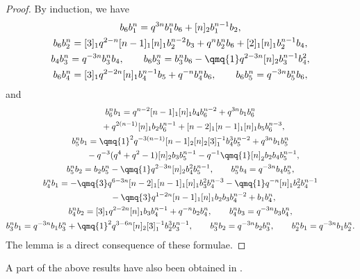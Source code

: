 \begin{proof} By induction, we have
\begin{gather*}
 b_6 b_1^n = q^{3 n} b_1^n b_6+[n]_2 b_1^{n-1} b_2,\\
 b_6 b_2^n = [3]_1 q^{2-n} [n-1]_1 [n]_1 b_2^{n-2} b_3+q^n b_2^n b_6+[2]_1 [n]_1 b_2^{n-1} b_4,\\
 b_4 b_3^n = q^{-3 n} b_3^n b_4,\qquad
 b_6 b_3^n = b_3^n b_6-\qmq{1} q^{2-3 n} [n]_2 b_3^{n-1} b_4^2,\\
 b_6 b_4^n = [3]_1 q^{2-2 n} [n]_1 b_4^{n-1} b_5+q^{-n} b_4^n b_6, \qquad
 b_6 b_5^n = q^{-3 n} b_5^n b_6,
 \end{gather*}
and
\begin{gather*}
 b_6^n b_1 = q^{n-2} [n-1]_1 [n]_1 b_4 b_6^{n-2}+q^{3 n} b_1 b_6^n \\
\hphantom{b_6^n b_1 =}{}
 +q^{2 (n-1)} [n]_1 b_2 b_6^{n-1}+[n-2]_1 [n-1]_1 [n]_1 b_5 b_6^{n-3},\\
 b_5^n b_1 = \qmq{1}^2 q^{-3 (n-1)} [n-1]_2 [n]_2 [3]_1^{-1}b_4^3 b_5^{n-2}+q^{3 n} b_1 b_5^n\\
\hphantom{b_5^n b_1 =}{}
 -q^{-3}(q^4+q^2-1) [n]_2 b_3 b_5^{n-1}-q^{-1}\qmq{1} [n]_2 b_2 b_4 b_5^{n-1},\\
 b_5^n b_2 = b_2 b_5^n-\qmq{1} q^{2-3 n} [n]_2 b_4^2 b_5^{n-1},\qquad
 b_5^n b_4 = q^{-3 n} b_4 b_5^n,\\
 b_4^n b_1 = -\qmq{3} q^{6-3 n} [n-2]_1 [n-1]_1 [n]_1 b_3^2 b_4^{n-3}-\qmq{1} q^{-n} [n]_1b_2^2 b_4^{n-1}\\
\hphantom{b_4^n b_1 =}{}
 -\qmq{3} q^{1-2 n} [n-1]_1 [n]_1 b_2 b_3 b_4^{n-2}+b_1 b_4^n,\\
 b_4^n b_2 = [3]_1 q^{2-2 n} [n]_1 b_3 b_4^{n-1}+q^{-n} b_2 b_4^n,\qquad
 b_4^n b_3 = q^{-3 n} b_3 b_4^n,\\
 b_3^n b_1 = q^{-3 n} b_1 b_3^n+\qmq{1}^2 q^{3-6 n} [n]_2 [3]_1^{-1}b_2^3 b_3^{n-1},\qquad
 b_3^n b_2 = q^{-3 n} b_2 b_3^n,\qquad
 b_2^n b_1 = q^{-3 n} b_1 b_2^n.
\end{gather*}
The lemma is a direct consequence of these formulae.
\end{proof}

A part of the above results have also been obtained in \cite{Xi95}.

